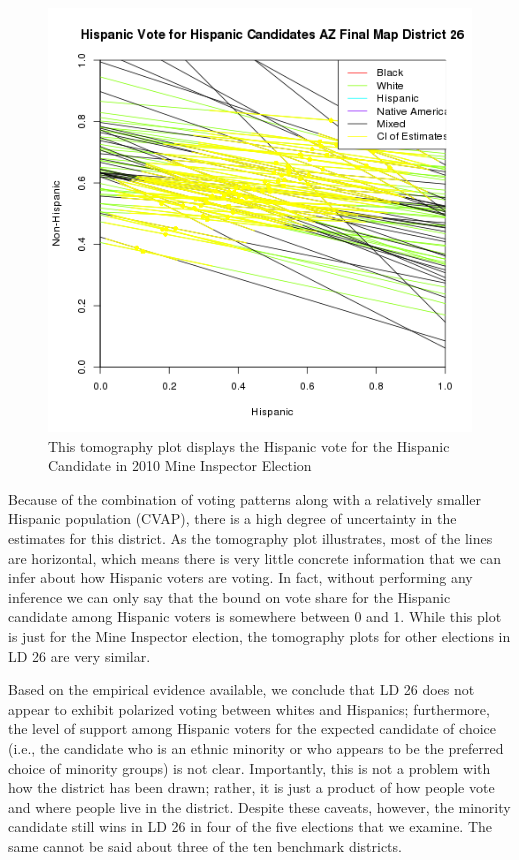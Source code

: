 \documentclass[12pt]{article}
\begin{document}
\begin{figure}[htb]
\begin{center}
\includegraphics[scale=.75]{figs/pl_hispvote_h_26_smine.png}
\caption{\label{tomog_26}This tomography plot displays the Hispanic vote for the Hispanic Candidate in 2010 Mine Inspector Election}
\end{center}
\end{figure}

Because of the combination of voting patterns along with a relatively smaller Hispanic population (CVAP), there is a high degree of uncertainty in the estimates for this district. As the tomography plot illustrates, most of the lines are horizontal, which means there is very little concrete information that we can infer about how Hispanic voters are voting. In fact, without performing any inference we can only say that the bound on vote share for the Hispanic candidate among Hispanic voters is somewhere between 0 and 1. While this plot is just for the Mine Inspector election, the tomography plots for other elections in LD 26 are very similar. 

Based on the empirical evidence available, we conclude that LD 26 does not appear to exhibit polarized voting between whites and Hispanics; furthermore, the level of support among Hispanic voters for the expected candidate of choice (i.e., the candidate who is an ethnic minority or who appears to be the preferred choice of minority groups) is not clear. Importantly, this is not a problem with how the district has been drawn; rather, it is just a product of how people vote and where people live in the district. Despite these caveats, however, the minority candidate still wins in LD 26 in four of the five elections that we examine. The same cannot be said about three of the ten benchmark districts.
\end{document}
